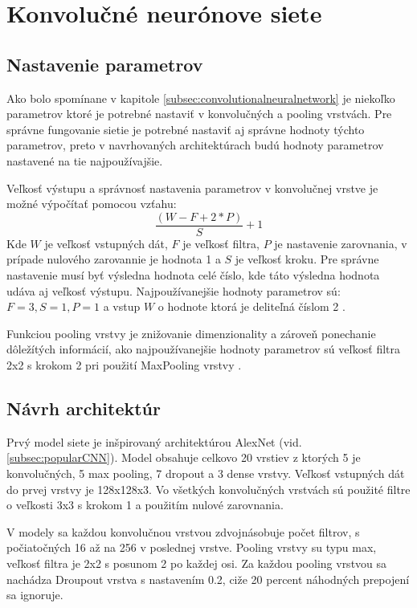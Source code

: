 
\section{Konvolučné neurónove siete}
\label{sec:architekuraCNN}

\subsection{Nastavenie parametrov}
Ako bolo spomínane v kapitole \ref{subsec:convolutionalneuralnetwork} je niekoľko parametrov ktoré je potrebné
    nastaviť v konvolučných a pooling vrstvách.
Pre správne fungovanie sietie je potrebné nastaviť aj správne hodnoty týchto parametrov, preto v navrhovaných architektúrach budú
    hodnoty parametrov nastavené na tie najpoužívajšie.

Veľkosť výstupu a správnosť nastavenia parametrov v konvolučnej vrstve je možné výpočítať pomocou vzťahu:
\begin{equation}
    \frac{(W - F + 2*P)}{S} + 1
\end{equation}
Kde $W$ je veľkosť vstupných dát, $F$ je veľkosť filtra, $P$ je nastavenie zarovnania, v prípade nulového zarovannie je hodnota 1 a $S$ je veľkosť kroku.
Pre správne nastavenie musí byť výsledna hodnota celé číslo, kde táto výsledna hodnota udáva aj veľkosť výstupu.
Najpoužívanejšie hodnoty parametrov sú: $F = 3, S = 1, P = 1$ a vstup $W$ o hodnote ktorá je deliteľná číslom 2 \cite{odkaz:CNNArchitecture}.

Funkciou pooling vrstvy je znižovanie dimenzionality a zároveň ponechanie dôležítých informácií, ako najpoužívanejšie hodnoty parametrov sú
    veľkosť filtra 2x2 s krokom 2 pri použití MaxPooling vrstvy \cite{odkaz:CNNArchitecture}.

\subsection{Návrh architektúr}
Prvý model siete je inšpirovaný architektúrou AlexNet (vid. \ref{subsec:popularCNN}).
Model obsahuje celkovo 20 vrstiev z ktorých 5 je konvolučných, 5 max pooling, 7 dropout a 3 dense vrstvy.
Veľkosť vstupných dát do prvej vrstvy je 128x128x3.
Vo všetkých konvolučných vrstvách sú použité filtre o veľkosti 3x3 s krokom 1 a použitím nulové zarovnania.

V modely sa každou konvolučnou vrstvou zdvojnásobuje počet filtrov, s počiatočných 16 až na 256 v poslednej vrstve.
Pooling vrstvy su typu max, veľkosť filtra je 2x2 s posunom 2 po každej osi.
Za každou pooling vrstvou sa nachádza Droupout vrstva s nastavením 0.2, ciže 20 percent náhodných prepojení sa ignoruje.

